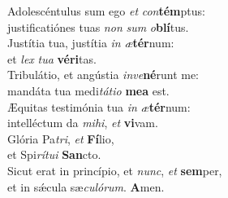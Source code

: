 \oddverse Adolescéntulus sum ego \textit{et} \textit{con}\textbf{tém}ptus:~\*\\
\oddverse justificatiónes tuas \textit{non} \textit{sum} \textit{o}\textbf{blí}tus.\\
\evenverse Justítia tua, justítia \textit{in} \textit{æ}\textbf{tér}num:~\*\\
\evenverse et \textit{lex} \textit{tu}\textit{a} \textbf{vé}\textbf{ri}tas.\\
\oddverse Tribulátio, et angústia \textit{in}\textit{ve}\textbf{né}runt me:~\*\\
\oddverse mandáta tua medi\textit{tá}\textit{ti}\textit{o} \textbf{me}\textbf{a} est.\\
\evenverse Æquitas testimónia tua \textit{in} \textit{æ}\textbf{tér}num:~\*\\
\evenverse intelléctum da \textit{mi}\textit{hi}, \textit{et} \textbf{vi}vam.\\
\oddverse Glória Pa\textit{tri}, \textit{et} \textbf{Fí}lio,~\*\\
\oddverse et Spi\textit{rí}\textit{tu}\textit{i} \textbf{San}cto.\\
\evenverse Sicut erat in princípio, et \textit{nunc}, \textit{et} \textbf{sem}per,~\*\\
\evenverse et in sǽcula sæ\textit{cu}\textit{ló}\textit{rum}. \textbf{A}men.\\
